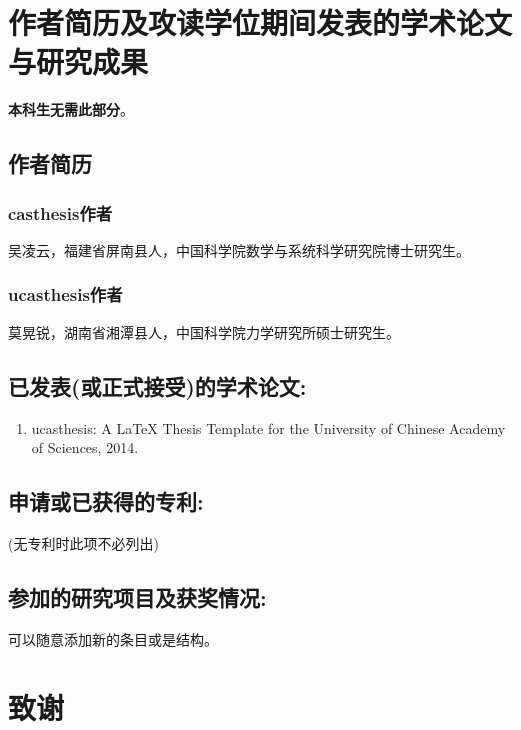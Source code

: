 \chapter{作者简历及攻读学位期间发表的学术论文与研究成果}

\textbf{本科生无需此部分}。

\section*{作者简历}

\subsection*{casthesis作者}

吴凌云，福建省屏南县人，中国科学院数学与系统科学研究院博士研究生。

\subsection*{ucasthesis作者}

莫晃锐，湖南省湘潭县人，中国科学院力学研究所硕士研究生。

\section*{已发表(或正式接受)的学术论文:}

{
\setlist[enumerate]{}%
\begin{enumerate}[nosep]
    \item ucasthesis: A LaTeX Thesis Template for the University of Chinese Academy of Sciences, 2014.
\end{enumerate}
}

\section*{申请或已获得的专利:}

(无专利时此项不必列出)

\section*{参加的研究项目及获奖情况:}

可以随意添加新的条目或是结构。

\chapter[致谢]{致\quad 谢}%
\thispagestyle{noheaderstyle}%

